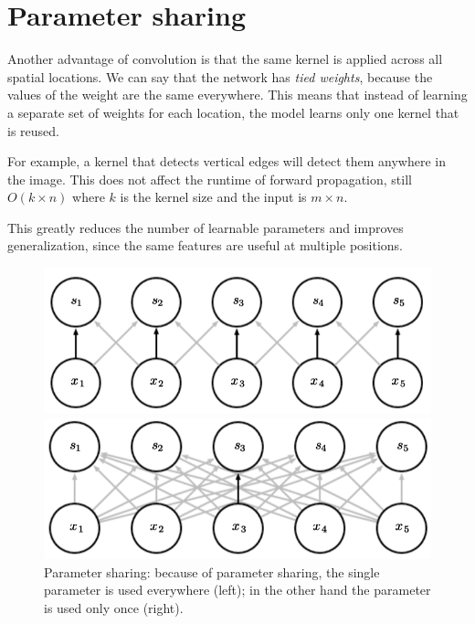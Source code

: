 \section{Parameter sharing}

Another advantage of convolution is that the same kernel is applied across all spatial locations.  
We can say that the network has \textit{tied weights}, because the values of the weight are the same everywhere. This means that instead of learning a separate set of weights for each location, the model learns only one kernel that is reused.  

For example, a kernel that detects vertical edges will detect them anywhere in the image. This does not affect the runtime of forward propagation, still $O(k\times n)$ where $k$ is the kernel size and the input is $m\times n$.

\clearpage

This greatly reduces the number of learnable parameters and improves generalization, since the same features are useful at multiple positions.

\begin{figure}[H]
    \centering
    \begin{minipage}{0.45\textwidth}
        \centering
        \includegraphics[width=\linewidth]{Images/Chapters/param_sharing2.png}
    \end{minipage}
    \hfill
    \begin{minipage}{0.45\textwidth}
        \centering
        \includegraphics[width=\linewidth]{Images/Chapters/param_sharing1.png}
    \end{minipage}
    \caption{Parameter sharing: because of parameter sharing, the single parameter is used everywhere (left); in the other hand the parameter is used only once (right).}
    \label{fig:param_sharing}
\end{figure}

